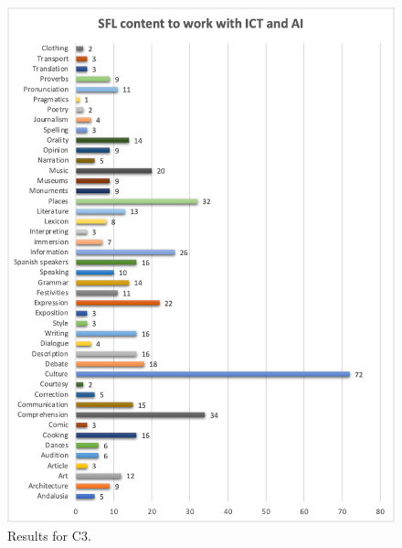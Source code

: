\documentclass[english]{textolivre}
\begin{document}
\begin{figure}[h!]
    \centering
    \begin{minipage}{0.90\linewidth}
    \includegraphics[width=\linewidth]{Images/FIGURA3.png}
    \caption{Results for C3.}
    \label{fig-3}
    \end{minipage}
\end{figure}
\end{document}
